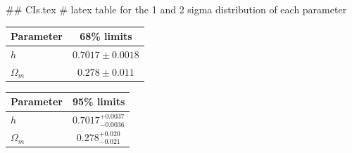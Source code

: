 ## CIs.tex
# latex table for the 1 and 2 sigma distribution of each parameter

\begin{tabular} { l  c}
 Parameter &  68\% limits\\
\hline
{\boldmath$h              $} & $0.7017\pm 0.0018          $\\
{\boldmath$\Omega_m       $} & $0.278\pm 0.011            $\\
\hline
\end{tabular}

\begin{tabular} { l  c}
 Parameter &  95\% limits\\
\hline
{\boldmath$h              $} & $0.7017^{+0.0037}_{-0.0036}$\\
{\boldmath$\Omega_m       $} & $0.278^{+0.020}_{-0.021}   $\\
\hline
\end{tabular}
